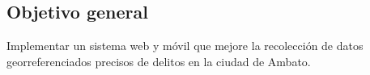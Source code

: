 \subsection{Objetivo general}
Implementar un sistema web y móvil que mejore la recolección de datos
georreferenciados precisos de delitos en la ciudad de Ambato.

